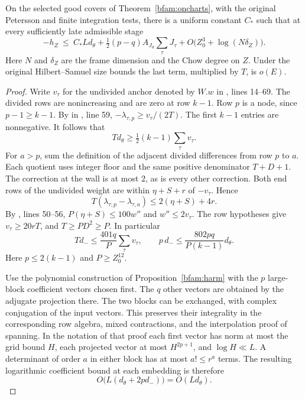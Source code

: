\begin{proposition}\label{recheight:harmonic}
On the selected good covers of Theorem~\ref{bfam:oncharts}, with the
original Petersson and finite integration tests, there is a uniform
constant \(C_*\) such that at every sufficiently late admissible stage
\[
 -h_Z\ \le\ C_*L d_\theta+
       \tfrac12(p-q) A_{J_d}\sum_\tau J_\tau
       +O\bigl(Z_0^3+\log(N\delta_Z)\bigr).
\]
Here \(N\) and \(\delta_Z\) are the frame dimension and the Chow degree
on \(Z\). Under the original Hilbert--Samuel size bounds the last
term, multiplied by \(T\), is \(o(E)\).
\end{proposition}
\begin{proof}
Write \(v_\tau\) for the undivided anchor denoted by \(W.w\) in
, lines 14--69. The divided rows are
nonincreasing and are zero at row \(k-1\). Row \(p\) is a node,
since \(p-1\ge k-1\). By  in
, line 59,
\(-\lambda_{\tau,p}\ge v_\tau/(2T)\). The first \(k-1\) entries
are nonnegative. It follows that
\begin{equation}\label{recheight:degree-lower}
       T d_\theta\ge \tfrac12(k-1)\sum_\tau v_\tau .
\end{equation}
For \(a>p\), sum the definition of the adjacent divided differences
from row \(p\) to \(a\). Each quotient uses integer floor and the
same positive denominator \(T+D+1\). The correction at the wall is
at most \(2\), as is every other correction. Both end rows of the
undivided weight are within \(\eta+S+r\) of \(-v_\tau\). Hence
\[
  T(\lambda_{\tau,p}-\lambda_{\tau,a})
                \le 2(\eta+S)+4r .
\]
By , lines 50--56, \(P(\eta+S)\le100w''\)
and \(w''\le2v_\tau\). The row hypotheses give \(v_\tau\ge20rT\),
and \(T\ge PD^2\ge P\). In particular
\[
      T d_-\le \frac{401q}{P}\sum_\tau v_\tau,\qquad
      p\,d_-\le\frac{802pq}{P(k-1)}d_\theta .
\]
Here \(p\le 2(k-1)\) and \(P\ge Z_0^{12}\).

Use the polynomial construction of Proposition~\ref{bfam:harm}
with the \(p\) large-block coefficient vectors chosen first.
The \(q\) other vectors are obtained by the adjugate projection
there. The two blocks can be exchanged, with complex conjugation
of the input vectors. This preserves their integrality in the
corresponding row algebra, mixed contractions, and the interpolation
proof of spanning. In the notation of that proof each first vector
has norm at most the grid bound \(H\), each projected vector at most
\(H^{2p+1}\), and \(\log H\ll L\). A determinant of order \(a\)
in either block has at most \(a!\le r^a\) terms. The resulting
logarithmic coefficient bound at each embedding is therefore
\[
       O\bigl(L(d_\theta+2p d_-)\bigr)=O(Ld_\theta).
\]


\end{proof}
